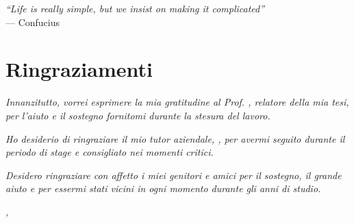 
\cleardoublepage
{}
{}

\begin{flushright}{
	\slshape
	``Life is really simple, but we insist on making it complicated''} \\
	\medskip
    --- Confucius
\end{flushright}


\bigskip

\begingroup
\let\clearpage\relax
\let\cleardoublepage\relax
\let\cleardoublepage\relax

\chapter*{Ringraziamenti}

\noindent \textit{Innanzitutto, vorrei esprimere la mia gratitudine al Prof. \myProf, relatore della mia tesi, per l'aiuto e il sostegno fornitomi durante la stesura del lavoro.}
\bigskip

\noindent \textit{Ho desiderio di ringraziare il mio tutor aziendale, \fabio, per avermi seguito durante il periodo di stage e consigliato nei momenti critici.} %
\bigskip

\noindent \textit{Desidero ringraziare con affetto i miei genitori e amici per il sostegno, il grande aiuto e per essermi stati vicini in ogni momento durante gli anni di studio.}
\bigskip


\noindent\textit{\myLocation, \myTime}
\hfill \myName

\endgroup
